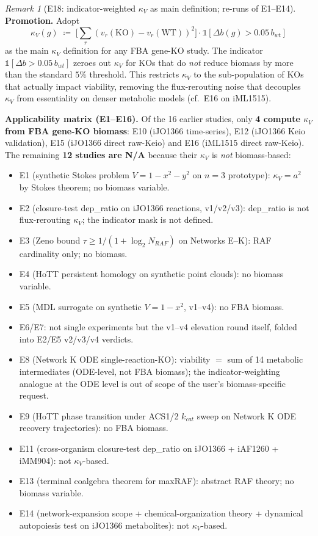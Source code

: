 \documentclass[11pt,a4paper]{article}
\theoremstyle{plain}
\theoremstyle{definition}
\theoremstyle{remark}
\newtheorem{remark}[theorem]{Remark}
\begin{document}
\begin{remark}[E18: indicator-weighted $\kappa_V$ as main definition;
re-runs of E1--E14]
\label{rem:e18-indicator-main-definition}
\textbf{Promotion.} Adopt
\[
\kappa_V(g) \;\coloneqq\; \Big[\textstyle\sum_r (v_r(\text{KO}) - v_r(\text{WT}))^2\Big]\cdot\mathbb{1}[\Delta b(g) > 0.05\,b_{wt}]
\]
as the main $\kappa_V$ definition for any FBA gene-KO study. The
indicator $\mathbb{1}[\Delta b > 0.05\,b_{wt}]$ zeroes out $\kappa_V$
for KOs that do \emph{not} reduce biomass by more than the standard
$5\%$ threshold. This restricts $\kappa_V$ to the sub-population of KOs
that actually impact viability, removing the flux-rerouting noise that
decouples $\kappa_V$ from essentiality on denser metabolic models
(cf.\ E16 on iML1515).

\textbf{Applicability matrix (E1--E16).} Of the 16 earlier studies,
only \textbf{4 compute $\kappa_V$ from FBA gene-KO biomass}:
E10 (iJO1366 time-series), E12 (iJO1366 Keio validation),
E15 (iJO1366 direct raw-Keio) and E16 (iML1515 direct raw-Keio).
The remaining \textbf{12 studies are N/A} because their $\kappa_V$ is
\emph{not} biomass-based:
\begin{itemize}\itemsep0pt
\item E1 (synthetic Stokes problem $V=1-x^2-y^2$ on $n=3$ prototype):
$\kappa_V = a^2$ by Stokes theorem; no biomass variable.
\item E2 (closure-test dep\_ratio on iJO1366 reactions, v1/v2/v3):
dep\_ratio is not flux-rerouting $\kappa_V$; the indicator mask is not
defined.
\item E3 (Zeno bound $\tau \geq 1/(1+\log_2 N_{RAF})$ on Networks
E--K): RAF cardinality only; no biomass.
\item E4 (HoTT persistent homology on synthetic point clouds):
no biomass variable.
\item E5 (MDL surrogate on synthetic $V=1-x^2$, v1--v4): no FBA
biomass.
\item E6/E7: not single experiments but the v1--v4 elevation round
itself, folded into E2/E5 v2/v3/v4 verdicts.
\item E8 (Network K ODE single-reaction-KO): viability $=$ sum of 14
metabolic intermediates (ODE-level, not FBA biomass); the
indicator-weighting analogue at the ODE level is out of scope of the
user's biomass-specific request.
\item E9 (HoTT phase transition under ACS1/2 $k_{cat}$ sweep on
Network K ODE recovery trajectories): no FBA biomass.
\item E11 (cross-organism closure-test dep\_ratio on iJO1366 +
iAF1260 + iMM904): not $\kappa_V$-based.
\item E13 (terminal coalgebra theorem for maxRAF): abstract RAF
theory; no biomass variable.
\item E14 (network-expansion scope + chemical-organization theory +
dynamical autopoiesis test on iJO1366 metabolites): not
$\kappa_V$-based.
\end{itemize}


\end{remark}
\end{document}
